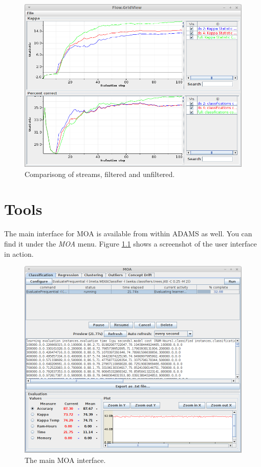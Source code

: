 \documentclass[a4paper]{book}
\begin{document}
\begin{figure}[htb]
  \centering
  \includegraphics[width=12.0cm]{images/moa-stream-filtering_output.png}
  \caption{Comparisong of streams, filtered and unfiltered.}
  \label{moa-stream-filtering_output}
\end{figure}

\chapter{Tools}
The main interface for MOA is available from within ADAMS as well. You can
find it under the \textit{MOA} menu. Figure \ref{moa-gui} shows a screenshot
of the user interface in action.
\begin{figure}[htb]
  \centering
  \includegraphics[width=12.0cm]{images/moa-gui.png}
  \caption{The main MOA interface.}
  \label{moa-gui}
\end{figure}



\end{document}
